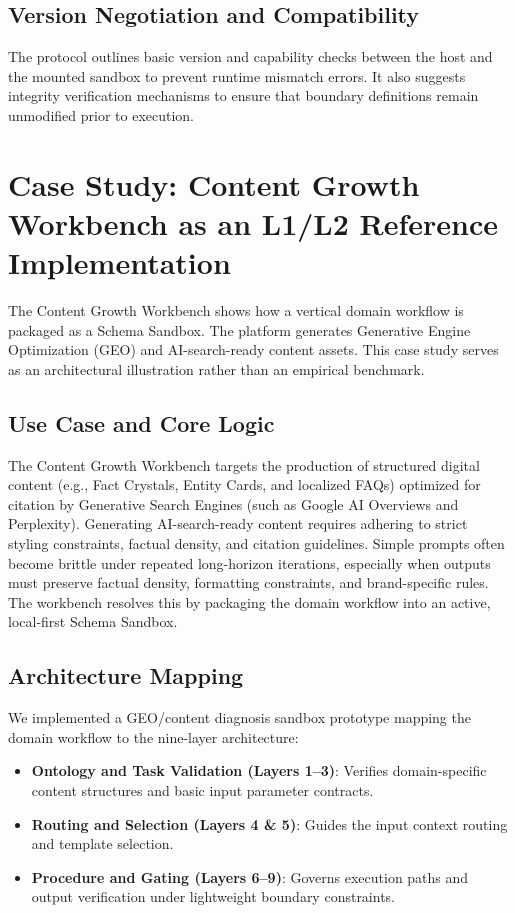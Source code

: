 \documentclass[10pt,journal,compsoc]{IEEEtran}
\begin{document}
\subsection{Version Negotiation and Compatibility}
The protocol outlines basic version and capability checks between the host and the mounted sandbox to prevent runtime mismatch errors. It also suggests integrity verification mechanisms to ensure that boundary definitions remain unmodified prior to execution.


\section{Case Study: Content Growth Workbench as an L1/L2 Reference Implementation}
The Content Growth Workbench shows how a vertical domain workflow is packaged as a Schema Sandbox. The platform generates Generative Engine Optimization (GEO) and AI-search-ready content assets. This case study serves as an architectural illustration rather than an empirical benchmark.

\subsection{Use Case and Core Logic}
The Content Growth Workbench targets the production of structured digital content (e.g., Fact Crystals, Entity Cards, and localized FAQs) optimized for citation by Generative Search Engines (such as Google AI Overviews and Perplexity). Generating AI-search-ready content requires adhering to strict styling constraints, factual density, and citation guidelines. Simple prompts often become brittle under repeated long-horizon iterations, especially when outputs must preserve factual density, formatting constraints, and brand-specific rules. The workbench resolves this by packaging the domain workflow into an active, local-first Schema Sandbox.

\subsection{Architecture Mapping}
We implemented a GEO/content diagnosis sandbox prototype mapping the domain workflow to the nine-layer architecture:
\begin{itemize}
  \item \textbf{Ontology and Task Validation (Layers 1--3)}: Verifies domain-specific content structures and basic input parameter contracts.
  \item \textbf{Routing and Selection (Layers 4 \& 5)}: Guides the input context routing and template selection.
  \item \textbf{Procedure and Gating (Layers 6--9)}: Governs execution paths and output verification under lightweight boundary constraints.
\end{itemize}
\end{document}
